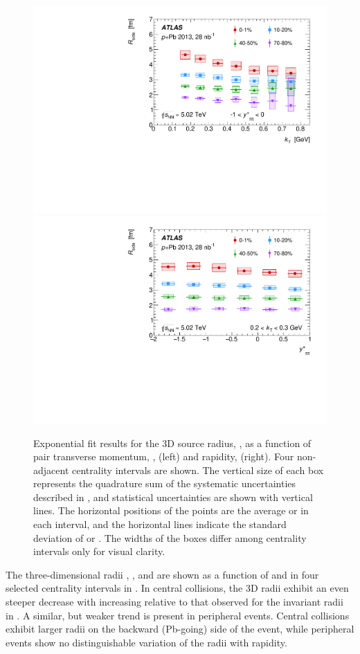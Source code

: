 \begin{figure}[ht]
\centering
\includegraphics[width=.49\linewidth]{canqosl_Rside_vs_kt.pdf}
\includegraphics[width=.49\linewidth]{canqosl_Rside_vs_kys.pdf}
\caption{Exponential fit results for the 3D source radius, \Rside, as a function of pair transverse momentum, \kt, (left) and rapidity, \kys (right). Four non-adjacent centrality intervals are shown. The vertical size of each box represents the quadrature sum of the systematic uncertainties described in , and statistical uncertainties are shown with vertical lines. The horizontal positions of the points are the average \kt or \kys in each interval, and the horizontal lines indicate the standard deviation of \kt or \kys. The widths of the boxes differ among centrality intervals only for visual clarity.}
\label{fig:results_Rside}
\end{figure}


The three-dimensional radii \Rout, \Rside, and \Rlong are shown as a function of \kt and \kys in four selected centrality intervals in .
In central collisions, the 3D radii exhibit an even steeper decrease with increasing \kt relative to that observed for the invariant radii in .
A similar, but weaker trend is present in peripheral events.
Central collisions exhibit larger radii on the backward (Pb-going) side of the event, while peripheral events show no distinguishable variation of the radii with rapidity.

